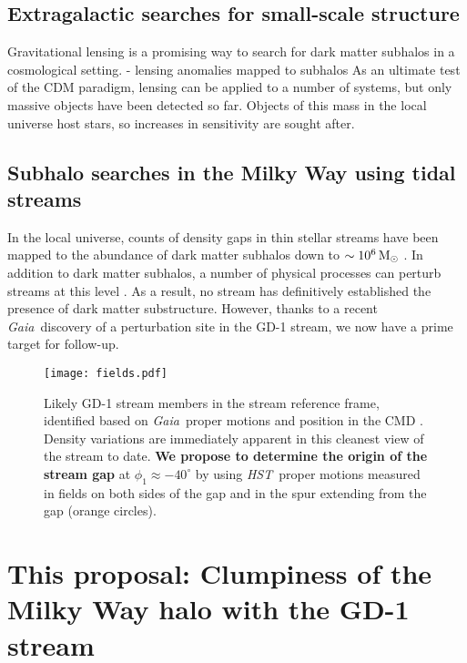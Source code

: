 \documentclass[12pt]{article}
\newcommand{\hst}{\textsl{HST}}
\newcommand{\gaia}{\textsl{Gaia}}
\begin{document}
\subsection*{Extragalactic searches for small-scale structure}
Gravitational lensing is a promising way to search for dark matter subhalos in a cosmological setting.
- lensing anomalies mapped to subhalos
As an ultimate test of the CDM paradigm, lensing can be applied to a number of systems, but only massive objects have been detected so far.
Objects of this mass in the local universe host stars, so increases in sensitivity are sought after.

\subsection*{Subhalo searches in the Milky Way using tidal streams}
In the local universe, counts of density gaps in thin stellar streams have been mapped to the abundance of dark matter subhalos down to $\sim10^6\,\rm M_\odot$ \parencite[e.g.,][]{carlberg2012,carlberg2013b}.
In addition to dark matter subhalos, a number of physical processes can perturb streams at this level \parencite[e.g.,][]{kupper2008, amorisco2016}.
As a result, no stream has definitively established the presence of dark matter substructure.
However, thanks to a recent \gaia\ discovery of a perturbation site in the GD-1 stream, we now have a prime target for follow-up.

\begin{figure}
\begin{center}
\texttt{[image: fields.pdf]}
\end{center}
\caption{
Likely GD-1 stream members in the stream reference frame, identified based on \gaia\ proper motions and position in the CMD \parencite{pwb2018}.
Density variations are immediately apparent in this cleanest view of the stream to date.
{\bf We propose to determine the origin of the stream gap} at $\phi_1\approx-40^\circ$ by using \hst\ proper motions measured in fields on both sides of the gap and in the spur extending from the gap (orange circles).
}
\label{fig:fields}
\end{figure}

\section*{This proposal: Clumpiness of the Milky Way halo with the GD-1 stream}
\end{document}
